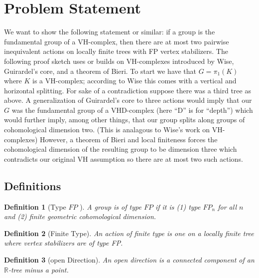 \documentclass{article}
\theoremstyle{mystyle}
\newtheorem{defn}{Definition}
\theoremstyle{remark}
\begin{document}
\section{Problem Statement}


We want to show the following statement or similar: if a group is the fundamental group of a VH-complex, then there are at most two pairwise inequivalent actions on locally finite trees with FP vertex stabilizers. The following proof sketch uses or builds on VH-complexes introduced by Wise, Guirardel's core, and a theorem of Bieri. To start we have that \(G = \pi_1(K)\) where \(K\) is a VH-complex; according to Wise this comes with a vertical and horizontal splitting. For sake of a contradiction suppose there was a third tree as above. A generalization of Guirardel's core to three actions would imply that our \(G\) was the fundamental group of a VHD-complex (here ``D'' is for ``depth'') which would further imply, among other things, that our group splits along groups of cohomological dimension two. (This is analagous to Wise's work on VH-complexes) However, a theorem of Bieri and local finiteness forces the cohomological dimension of the resulting group to be dimension three which contradicts our original VH assumption so there are at most two such actions.

\subsection{Definitions}

\begin{defn}
	[Type \(FP\) ]
	A group is of type \(FP\) if it is (1) type \(FP_n\) for all \(n\) and (2) finite geometric cohomological dimension.
\end{defn}

\begin{defn}
	[Finite Type] 
	An action of {\em finite type} is one on a locally finite tree where  vertex stabilizers are of type FP.
\end{defn}

\begin{defn}[open Direction] An open direction is a connected component of an \(\mathbb{R}\)-tree minus a point. 
\end{defn}
\end{document}
